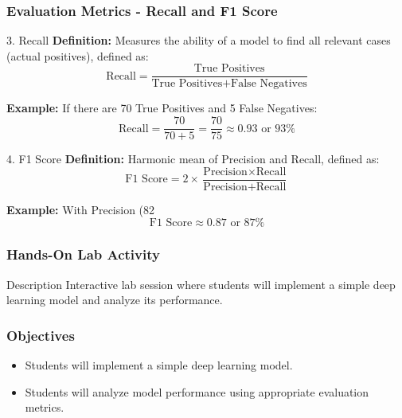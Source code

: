 \documentclass[aspectratio=169]{beamer}
\begin{document}
\begin{frame}[fragile]
    \frametitle{Evaluation Metrics - Recall and F1 Score}
    \begin{block}{3. Recall}
        \textbf{Definition:} Measures the ability of a model to find all relevant cases (actual positives), defined as:
        \begin{equation}
            \text{Recall} = \frac{\text{True Positives}}{\text{True Positives} + \text{False Negatives}}
        \end{equation}

        \textbf{Example:} If there are 70 True Positives and 5 False Negatives:
        \begin{equation}
            \text{Recall} = \frac{70}{70 + 5} = \frac{70}{75} \approx 0.93 \text{ or } 93\%
        \end{equation}
    \end{block}

    \begin{block}{4. F1 Score}
        \textbf{Definition:} Harmonic mean of Precision and Recall, defined as:
        \begin{equation}
            \text{F1 Score} = 2 \times \frac{\text{Precision} \times \text{Recall}}{\text{Precision} + \text{Recall}}
        \end{equation}

        \textbf{Example:} With Precision (82%
        \begin{equation}
            \text{F1 Score} \approx 0.87 \text{ or } 87\%
        \end{equation}
    \end{block}
\end{frame}

\begin{frame}[fragile]
    \frametitle{Hands-On Lab Activity}
    \begin{block}{Description}
        Interactive lab session where students will implement a simple deep learning model and analyze its performance.
    \end{block}
\end{frame}

\begin{frame}[fragile]
    \frametitle{Objectives}
    \begin{itemize}
        \item Students will implement a simple deep learning model.
        \item Students will analyze model performance using appropriate evaluation metrics.
    \end{itemize}
\end{frame}
\end{document}
